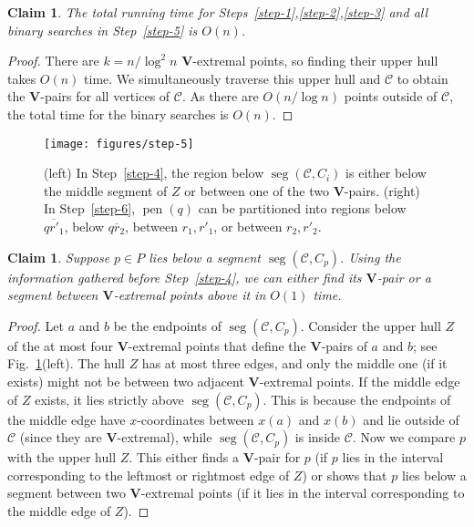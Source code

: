 \documentclass[letterpaper,11pt]{article}
\newtheorem{claim}[theorem]{Claim}
\DeclareMathOperator{\seg}{seg}
\DeclareMathOperator{\pen}{pen}
\newcommand{\cC}{\mathcal{C}}
\begin{document}
\begin{claim} \label{clm:step-123} 
  The total running time for 
  Steps~\ref{step-1},\ref{step-2},\ref{step-3}
  and all binary searches in 
  Step~\ref{step-5} is $O(n)$.
\end{claim}

\begin{proof} 
There are $k = n/\log^2 n$ $\textbf{V}$-extremal 
points, so finding their upper hull takes $O(n)$ time. 
We simultaneously traverse this upper hull and $\cC$ 
to obtain the $\textbf{V}$-pairs
for all vertices of $\cC$. As there are
$O(n/\log n)$ points outside of $\cC$, the
total time for the binary searches is $O(n)$.
\end{proof}

\begin{figure}
  \centering
  \texttt{[image: figures/step-5]}
  \caption{(left) In Step~\ref{step-4}, the 
    region below $\seg(\cC,C_i)$ is 
  either below the middle segment of $Z$
  or between one of the two $\textbf{V}$-pairs. 
  (right) In Step~\ref{step-6}, $\pen(q)$
  can be partitioned into regions below 
  $\overline{qr'_1}$, below $\overline{qr_2}$, 
  between $r_1, r'_1$, or between $r_2, r'_2$.}
  \label{fig:step-5}
\end{figure}


\begin{claim} \label{clm:step-4} 
  Suppose $p \in P$ lies below a segment $\seg(\cC, C_p)$.
  Using the information gathered before Step~\ref{step-4},
  we can either find its $\textbf{V}$-pair or a segment between 
  $\textbf{V}$-extremal points above it in $O(1)$ time.
\end{claim}

\begin{proof} 
Let $a$ and $b$ be the endpoints of 
$\seg(\cC, C_p)$. Consider the 
upper hull $Z$ of the at most four
$\textbf{V}$-extremal points  that define 
the $\textbf{V}$-pairs of $a$ and 
$b$; see Fig.~\ref{fig:step-5}(left). 
The hull $Z$ has at most three edges, 
and only the middle one (if it 
exists) might not be between two 
adjacent $\textbf{V}$-extremal points. 
If the middle edge of $Z$ exists, it lies 
strictly above $\seg(\cC, C_p)$. This is because 
the endpoints of the middle edge have $x$-coordinates 
between $x(a)$ and $x(b)$ and lie outside of 
$\cC$ (since they are $\textbf{V}$-extremal), 
while $\seg(\cC, C_p)$ is inside $\cC$.
Now we compare $p$ with the upper hull $Z$. This 
either finds a $\textbf{V}$-pair
for $p$ (if $p$ lies in the interval 
corresponding to the leftmost or rightmost 
edge of $Z$) or shows that $p$ lies below a segment between
two $\textbf{V}$-extremal points (if it lies in the
interval corresponding to the middle edge of $Z$).
\end{proof}
\end{document}
